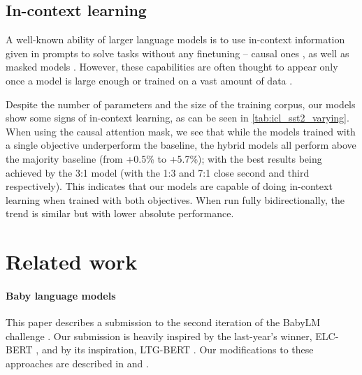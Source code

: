 \subsection{In-context learning}
\label{sec:icl}

A well-known ability of larger language models is to use in-context information given in prompts to solve tasks without any finetuning -- causal ones \citep{NEURIPS2020_1457c0d6}, as well as masked models \citep{samuel2024berts}. However, these capabilities are often thought to appear only once a model is large enough or trained on a vast amount of data \citep{wei2022emergent}. 

Despite the number of parameters and the size of the training corpus, our models show some signs of in-context learning, as can be seen in \cref{tab:icl_sst2_varying}. When using the causal attention mask, we see that while the models trained with a single objective underperform the baseline, the hybrid models all perform above the majority baseline (from +0.5\% to +5.7\%); with the best results being achieved by the 3:1 model (with the 1:3 and 7:1 close second and third respectively). This indicates that our models are capable of doing in-context learning when trained with both objectives. When run fully bidirectionally, the trend is similar but with lower absolute performance. %

\section{Related work}
\label{sec:related}

\paragraph{Baby language models} This paper describes a submission to the second iteration of the BabyLM challenge
\citep{warstadt-etal-2023-findings}. Our submission is heavily inspired by the last-year's winner, ELC-BERT \citep{georges-gabriel-charpentier-samuel-2023-layers}, and by its inspiration, LTG-BERT \citep{samuel-etal-2023-trained}. Our modifications to these approaches are described in  and .

